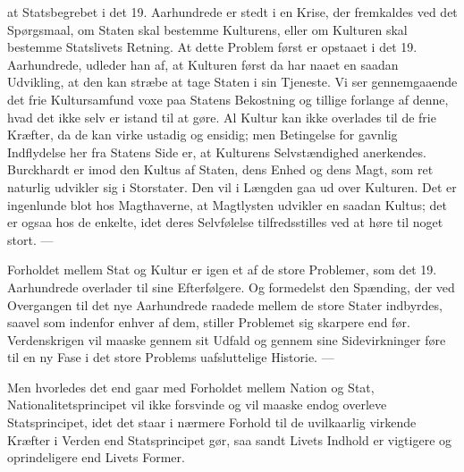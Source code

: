 \documentclass[12pt,a4paper,openany]{book}
\newcommand{\opage}[1]{\marginnote{\footnotesize\textit{[#1]}}}
\begin{document}
at Statsbegrebet i det 19. Aarhundrede er stedt i en Krise, der fremkaldes
ved det Spørgsmaal, om Staten skal bestemme Kulturens, eller
om Kulturen skal bestemme Statslivets Retning. At dette Problem
først er opstaaet i det 19. Aarhundrede, udleder han af, at Kulturen
først da har naaet en saadan Udvikling, at den kan stræbe at tage
Staten i sin Tjeneste. Vi ser gennemgaaende det frie Kultursamfund
voxe paa Statens Bekostning og tillige forlange af denne, hvad det
ikke selv er istand til at gøre. Al Kultur kan ikke overlades til de frie
Kræfter, da de kan virke ustadig og ensidig; men Betingelse for
gavnlig Indflydelse her fra Statens Side er, at Kulturens Selvstændighed
anerkendes. Burckhardt er imod den Kultus af Staten, dens
Enhed og dens Magt, som ret naturlig udvikler sig i Storstater. Den
vil i Længden gaa ud over Kulturen. Det er ingenlunde blot hos
Magthaverne, at Magtlysten udvikler en saadan Kultus; det er ogsaa
hos de enkelte, idet deres Selvfølelse tilfredsstilles ved at høre til
noget stort. ---

Forholdet mellem Stat og Kultur er igen et af de store Problemer,
som det 19. Aarhundrede overlader til sine Efterfølgere. Og formedelst
den Spænding, der ved Overgangen til det nye Aarhundrede
raadede mellem de store Stater indbyrdes, saavel som indenfor enhver
af dem, stiller Problemet sig skarpere end før. Verdenskrigen
\opage{109}vil maaske gennem sit Udfald og gennem sine Sidevirkninger føre til
en ny Fase i det store Problems uafsluttelige Historie. ---

Men hvorledes det end gaar med Forholdet mellem Nation og Stat,
Nationalitetsprincipet vil ikke forsvinde og vil maaske endog overleve
Statsprincipet, idet det staar i nærmere Forhold til de uvilkaarlig
virkende Kræfter i Verden end Statsprincipet gør, saa sandt Livets
Indhold er vigtigere og oprindeligere end Livets Former.
\end{document}
